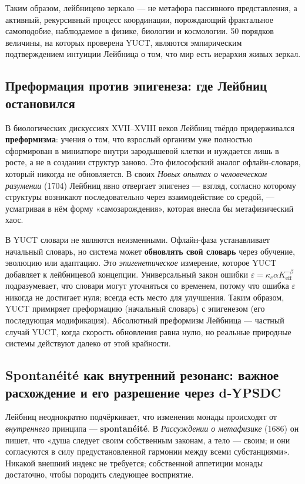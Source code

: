 \documentclass[12pt,a4paper]{article}
\begin{document}
	Таким образом, лейбницево зеркало — не метафора пассивного представления, а активный, рекурсивный процесс координации, порождающий фрактальное самоподобие, наблюдаемое в физике, биологии и космологии. 50 порядков величины, на которых проверена YUCT, являются эмпирическим подтверждением интуиции Лейбница о том, что мир есть иерархия живых зеркал.
	
	\subsection{Преформация против эпигенеза: где Лейбниц остановился}
	
	В биологических дискуссиях XVII–XVIII веков Лейбниц твёрдо придерживался \textbf{преформизма}: учения о том, что взрослый организм уже полностью сформирован в миниатюре внутри зародышевой клетки и нуждается лишь в росте, а не в создании структур заново. Это философский аналог офлайн-словаря, который никогда не обновляется. В своих \emph{Новых опытах о человеческом разумении} (1704) Лейбниц явно отвергает эпигенез — взгляд, согласно которому структуры возникают последовательно через взаимодействие со средой, — усматривая в нём форму «самозарождения», которая внесла бы метафизический хаос.
	
	В YUCT словари не являются неизменными. Офлайн-фаза устанавливает начальный словарь, но система может \textbf{обновлять свой словарь} через обучение, эволюцию или адаптацию. Это \emph{эпигенетическое} измерение, которое YUCT добавляет к лейбницевой концепции. Универсальный закон ошибки \(\varepsilon = \kappa_c \alpha K_{\mathrm{eff}}^{-\beta}\) подразумевает, что словари могут уточняться со временем, потому что ошибка \(\varepsilon\) никогда не достигает нуля; всегда есть место для улучшения. Таким образом, YUCT примиряет преформацию (начальный словарь) с эпигенезом (его последующая модификация). Абсолютный преформизм Лейбница — частный случай YUCT, когда скорость обновления равна нулю, но реальные природные системы действуют далеко от этой крайности.
	
	\subsection{Spontanéité как внутренний резонанс: важное расхождение и его разрешение через d‑YPSDC}
	
	Лейбниц неоднократно подчёркивает, что изменения монады происходят от \emph{внутреннего} принципа — \textbf{spontanéité}. В \emph{Рассуждении о метафизике} (1686) он пишет, что «душа следует своим собственным законам, а тело — своим; и они согласуются в силу предустановленной гармонии между всеми субстанциями». Никакой внешний индекс не требуется; собственной аппетиции монады достаточно, чтобы породить следующее восприятие.
	
\end{document}
